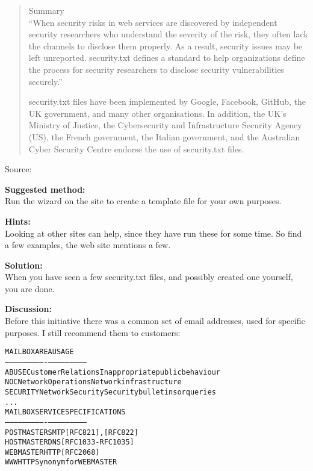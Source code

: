 \documentclass[a4paper,11pt,notitlepage]{report}
\begin{document}
\begin{quote}\footnotesize
Summary\\
“When security risks in web services are discovered by independent security researchers who understand the severity of the risk, they often lack the channels to disclose them properly. As a result, security issues may be left unreported. security.txt defines a standard to help organizations define the process for security researchers to disclose security vulnerabilities securely.”


security.txt files have been implemented by Google, Facebook, GitHub, the UK government, and many other organisations. In addition, the UK’s Ministry of Justice, the Cybersecurity and Infrastructure Security Agency (US), the French government, the Italian government, and the Australian Cyber Security Centre endorse the use of security.txt files.
\end{quote}

Source: 


{\bf Suggested method:}\\
Run the wizard on the site to create a template file for your own purposes.


{\bf Hints:}\\
Looking at other sites can help, since they have run these for some time. So find a few examples, the web site mentions a few.

{\bf Solution:}\\
When you have seen a few security.txt files, and possibly created one yourself, you are done.

{\bf Discussion:}\\
Before this initiative there was a common set of email addresses, used for specific purposes. I still recommend them to customers:

\begin{alltt}\footnotesize
MAILBOX       AREA                USAGE
-----------   ----------------    ---------------------------
ABUSE         Customer Relations  Inappropriate public behaviour
NOC           Network Operations  Network infrastructure
SECURITY      Network Security    Security bulletins or queries
...
MAILBOX       SERVICE             SPECIFICATIONS
-----------   ----------------    ---------------------------
POSTMASTER    SMTP                [RFC821], [RFC822]
HOSTMASTER    DNS                 [RFC1033-RFC1035]
WEBMASTER     HTTP                [RFC 2068]
WWW           HTTP                Synonym for WEBMASTER
\end{alltt}
\end{document}

